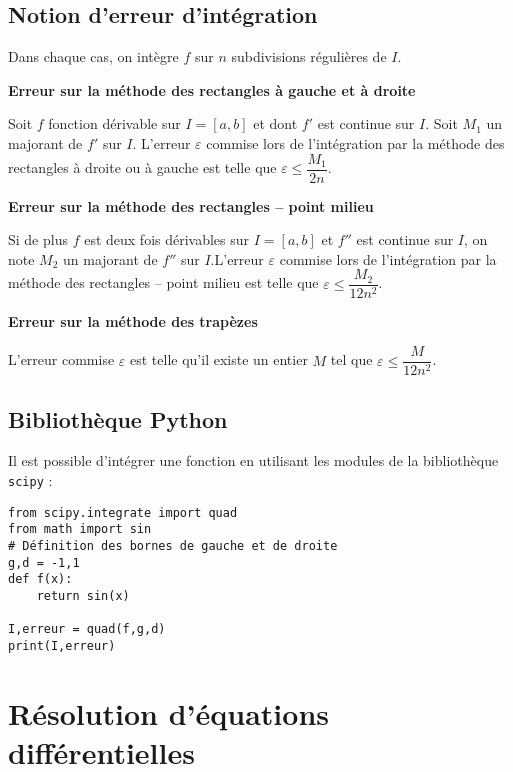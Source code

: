 \subsection*{Notion d'erreur d'intégration}
\begin{resultat}
Dans chaque cas,  on intègre $f$ sur $n$ subdivisions régulières de $I$. 

\textbf{Erreur sur la méthode des rectangles à gauche et à droite}

Soit $f$ fonction dérivable sur $I=[a,b]$ et dont $f'$ est continue sur $I$. Soit $M_1$ un majorant de $f'$ sur $I$. L'erreur $\varepsilon$ commise lors de l'intégration par la méthode des rectangles à droite ou à gauche
 est telle que $ \varepsilon \leq \dfrac{M_1}{2n}$.

\textbf{Erreur sur la méthode des rectangles -- point milieu}

Si de plus $f$ est deux fois dérivables sur $I=[a,b]$ et $f''$ est continue sur $I$, on note $M_2$ un majorant de $f''$ sur $I$.L'erreur $\varepsilon$ commise lors de l'intégration par la méthode des rectangles -- point milieu est telle que $ \varepsilon \leq \dfrac{M_2}{12n^2}$.

\textbf{Erreur sur la méthode des trapèzes}

L'erreur commise $\varepsilon$ est telle qu'il existe un entier $M$ tel que $ \varepsilon \leq \dfrac{M}{12n^2}$.

\end{resultat}

\subsection*{Bibliothèque Python}
Il est possible d'intégrer une fonction en utilisant les modules de la bibliothèque \texttt{scipy} :
\begin{lstlisting}
from scipy.integrate import quad
from math import sin
# Définition des bornes de gauche et de droite
g,d = -1,1 
def f(x):
    return sin(x)
   
I,erreur = quad(f,g,d)
print(I,erreur)
\end{lstlisting}


\section{Résolution d'équations différentielles}


